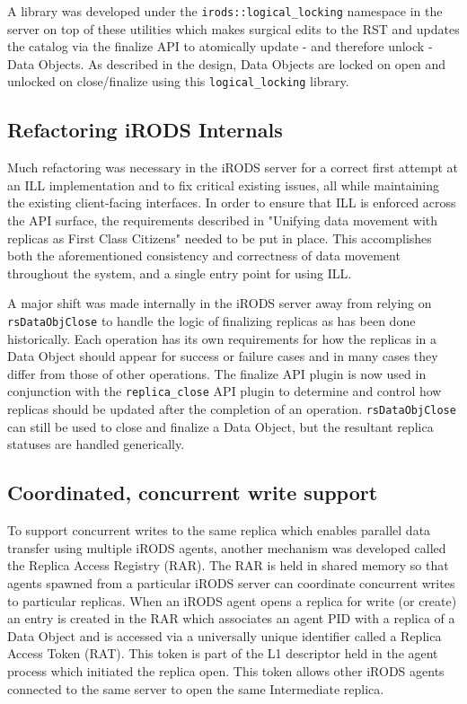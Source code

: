 \documentclass{irodsugm}
\begin{document}
A library was developed under the \texttt{irods::logical\_locking} namespace in the server on top of these utilities which makes surgical edits to the RST and updates the catalog via the finalize API to atomically update - and therefore unlock - Data Objects. As described in the design, Data Objects are locked on open and unlocked on close/finalize using this \texttt{logical\_locking} library.

\subsection*{Refactoring iRODS Internals}
Much refactoring was necessary in the iRODS server for a correct first attempt at an ILL implementation and to fix critical existing issues, all while maintaining the existing client-facing interfaces. In order to ensure that ILL is enforced across the API surface, the requirements described in "Unifying data movement with replicas as First Class Citizens" needed to be put in place. This accomplishes both the aforementioned consistency and correctness of data movement throughout the system, and a single entry point for using ILL.

A major shift was made internally in the iRODS server away from relying on \texttt{rsDataObjClose} to handle the logic of finalizing replicas as has been done historically. Each operation has its own requirements for how the replicas in a Data Object should appear for success or failure cases and in many cases they differ from those of other operations. The finalize API plugin is now used in conjunction with the \texttt{replica\_close} API plugin to determine and control how replicas should be updated after the completion of an operation. \texttt{rsDataObjClose} can still be used to close and finalize a Data Object, but the resultant replica statuses are handled generically.

\subsection*{Coordinated, concurrent write support}
To support concurrent writes to the same replica which enables parallel data transfer using multiple iRODS agents, another mechanism was developed called the Replica Access Registry (RAR). The RAR is held in shared memory so that agents spawned from a particular iRODS server can coordinate concurrent writes to particular replicas. When an iRODS agent opens a replica for write (or create) an entry is created in the RAR which associates an agent PID with a replica of a Data Object and is accessed via a universally unique identifier called a Replica Access Token (RAT). This token is part of the L1 descriptor held in the agent process which initiated the replica open. This token allows other iRODS agents connected to the same server to open the same Intermediate replica.
\end{document}
